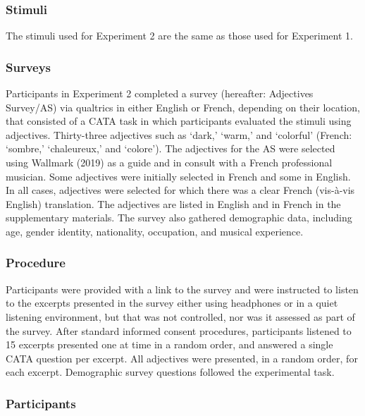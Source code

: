 \documentclass[
  english,
  man,floatsintext]{apa6}
\begin{document}
\hypertarget{stimuli-1}{%
\subsubsection{Stimuli}\label{stimuli-1}}

The stimuli used for Experiment 2 are the same as those used for Experiment 1.

\hypertarget{surveys}{%
\subsubsection{Surveys}\label{surveys}}

Participants in Experiment 2 completed a survey (hereafter: Adjectives Survey/AS) via qualtrics in either English or French, depending on their location, that consisted of a CATA task in which participants evaluated the stimuli using adjectives. Thirty-three adjectives such as `dark,' `warm,' and `colorful' (French: `sombre,' `chaleureux,' and `colore'). The adjectives for the AS were selected using Wallmark (2019) as a guide and in consult with a French professional musician. Some adjectives were initially selected in French and some in English. In all cases, adjectives were selected for which there was a clear French (vis-à-vis English) translation. The adjectives are listed in English and in French in the supplementary materials. The survey also gathered demographic data, including age, gender identity, nationality, occupation, and musical experience.

\hypertarget{procedure-1}{%
\subsubsection{Procedure}\label{procedure-1}}

Participants were provided with a link to the survey and were instructed to listen to the excerpts presented in the survey either using headphones or in a quiet listening environment, but that was not controlled, nor was it assessed as part of the survey. After standard informed consent procedures, participants listened to 15 excerpts presented one at time in a random order, and answered a single CATA question per excerpt. All adjectives were presented, in a random order, for each excerpt. Demographic survey questions followed the experimental task.

\hypertarget{participants-3}{%
\subsubsection{Participants}\label{participants-3}}
\end{document}
